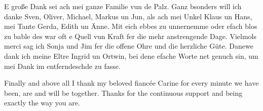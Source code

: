 
E große Dank sei ach
mei ganze Familie vun de Palz.
Ganz bsonders will ich danke Sven, Oliver,
Michael, Markus un Jun,
als ach mei Unkel Klaus un Hans,
mei Tante Gerda, Edith un Änne.
Mit eich ebbes zu unnernemme oder efach blos zu bable
des war oft e Quell vun Kraft fer die mehr anstrengende Dage.
Vielmols merci sag ich Sonja und Jim
fer die offene Ohre und die herzliche Güte.
Danewe dank ich meine Eltre Ingrid un Ortwin,
bei dene efache Worte net genuch sin,
um mei Dank im entferndeschde zu fasse.


Finally and above all I thank my beloved fianc\'ee Carine
for every minute we have been, are and will be together.
Thanks for the continuous support and being exactly the way you are.
